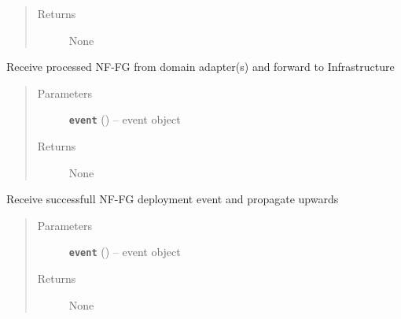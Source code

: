 \documentclass[letterpaper,10pt,english]{sphinxmanual}
\begin{document}
\begin{fulllineitems}
\begin{fulllineitems}
\begin{quote}
\begin{description}
\item[{Returns}] \leavevmode
None

\end{description}\end{quote}

\end{fulllineitems}


\begin{fulllineitems}
\label{adapt/cas_API:escape.adapt.cas_API.ControllerAdaptationAPI._handle_DeployEvent}
Receive processed NF-FG from domain adapter(s) and forward to Infrastructure
\begin{quote}\begin{description}
\item[{Parameters}] \leavevmode
\textbf{\texttt{event}} ({\hyperref[adapt/cas_API:escape.adapt.cas_API.DeployNFFGEvent]{\emph{}}}) -- event object

\item[{Returns}] \leavevmode
None

\end{description}\end{quote}

\end{fulllineitems}


\begin{fulllineitems}
\label{adapt/cas_API:escape.adapt.cas_API.ControllerAdaptationAPI._handle_DeploymentFinishedEvent}
Receive successfull NF-FG deployment event and propagate upwards
\begin{quote}\begin{description}
\item[{Parameters}] \leavevmode
\textbf{\texttt{event}} ({\hyperref[infr/il_API:escape.infr.il_API.DeploymentFinishedEvent]{\emph{}}}) -- event object

\item[{Returns}] \leavevmode
None

\end{description}\end{quote}

\end{fulllineitems}


\end{fulllineitems}
\end{document}
